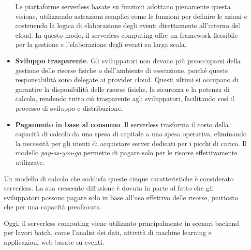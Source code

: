 \begin{itemize}
    Le piattaforme serverless basate su funzioni adottano pienamente questa visione, utilizzando astrazioni semplici come le funzioni per definire le azioni e costruendo la logica di elaborazione degli eventi direttamente all'interno del cloud. In questo modo, il serverless computing offre un framework flessibile per la gestione e l’elaborazione degli eventi su larga scala.
    \item \textbf{Sviluppo trasparente}. Gli sviluppatori non devono più preoccuparsi della gestione delle risorse fisiche o dell'ambiente di esecuzione, poiché queste responsabilità sono delegate ai provider cloud. Questi ultimi si occupano di garantire la disponibilità delle risorse fisiche, la sicurezza e la potenza di calcolo, rendendo tutto ciò trasparente agli sviluppatori, facilitando così il processo di sviluppo e distribuzione.
    \item \textbf{Pagamento in base al consumo}. Il serverless trasforma il costo della capacità di calcolo da una spesa di capitale a una spesa operativa, eliminando la necessità per gli utenti di acquistare server dedicati per i picchi di carico. Il modello \textit{pay-as-you-go} permette di pagare solo per le risorse effettivamente utilizzate.
\end{itemize}

Un modello di calcolo che soddisfa queste cinque caratteristiche è considerato serverless. La sua crescente diffusione è dovuta in parte al fatto che gli sviluppatori possono pagare solo in base all'uso effettivo delle risorse, piuttosto che per una capacità preallocata.

Oggi, il serverless computing viene utilizzato principalmente in scenari backend per lavori batch, come l'analisi dei dati, attività di machine learning e applicazioni web basate su eventi.\cite{10.1145/3508360}
